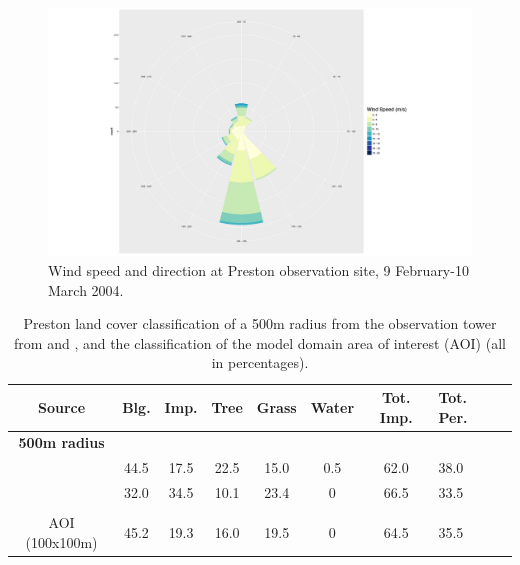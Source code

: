 \documentclass[final,3p,times,authoryear]{elsarticle}
\begin{document}
\begin{figure}[!htbp]
\includegraphics[trim = 95mm 25mm 80mm 25mm, clip, scale=0.25]{images/PrestonWindrose.png}
\caption{Wind speed and direction at Preston observation site, 9 February-10 March 2004. \label{fig:PrestonWind}}      
\end{figure}

\begin{table}[!htbp]
\caption
{Preston land cover classification of a 500m radius from the observation tower from \cite{Coutts2007} and \cite{Nury2015}, and the classification of the model domain area of interest (AOI) (all in percentages). \label{tab:expertValues}} 
\begin{tabular}{ |c |c| c | c |c |c |c|p{1.65cm}|p{1.65cm}| } 
\hline \textbf{Source} & \textbf{Blg.}&	\textbf{Imp.}&\textbf{Tree}&\textbf{Grass}	&\textbf{Water}&\textbf{Tot. Imp.}&\textbf{Tot. Per.} \\ \hline
\textbf{500m radius} & & & & & &	&  \\ \hline 
\cite{Coutts2007} &44.5 &17.5&22.5 &15.0 &0.5 &62.0 &38.0	  \\ \hline 
\cite{Nury2015} &32.0 &34.5 &10.1 &23.4 &0 &66.5 &33.5  \\ \hline 
 & & & & & &	&  \\ \hline 
AOI (100x100m) &45.2 &19.3 &16.0 &19.5 &0 &64.5	&35.5  \\ \hline 
\end{tabular} 
\end{table}  
 
\end{document}

